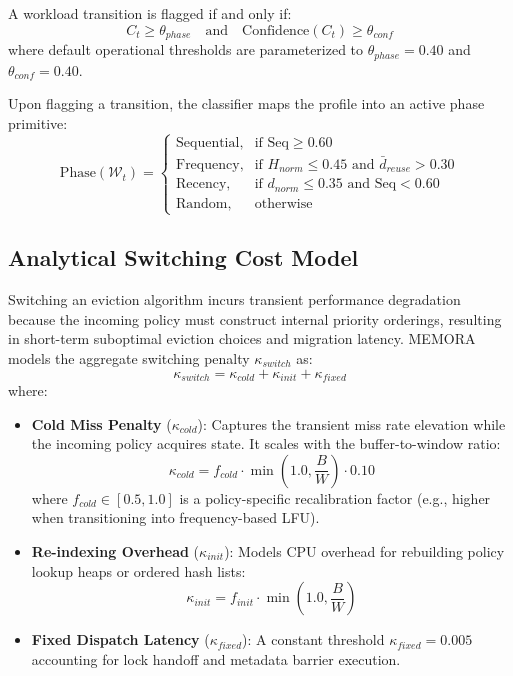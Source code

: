 \documentclass[conference]{IEEEtran}
\begin{document}
A workload transition is flagged if and only if:
\begin{equation}
C_t \ge \theta_{phase} \quad \text{and} \quad \text{Confidence}(C_t) \ge \theta_{conf}
\end{equation}
where default operational thresholds are parameterized to $\theta_{phase} = 0.40$ and $\theta_{conf} = 0.40$.

Upon flagging a transition, the classifier maps the profile into an active phase primitive:
\begin{equation}
\text{Phase}(\mathcal{W}_t) = \begin{cases}
\text{Sequential}, & \text{if } \text{Seq} \ge 0.60 \\
\text{Frequency}, & \text{if } H_{norm} \le 0.45 \text{ and } \bar{d}_{reuse} > 0.30 \\
\text{Recency}, & \text{if } d_{norm} \le 0.35 \text{ and } \text{Seq} < 0.60 \\
\text{Random}, & \text{otherwise}
\end{cases}
\end{equation}

\subsection{Analytical Switching Cost Model}
Switching an eviction algorithm incurs transient performance degradation because the incoming policy must construct internal priority orderings, resulting in short-term suboptimal eviction choices and migration latency. MEMORA models the aggregate switching penalty $\kappa_{switch}$ as:
\begin{equation}
\kappa_{switch} = \kappa_{cold} + \kappa_{init} + \kappa_{fixed}
\end{equation}
where:
\begin{itemize}
    \item \textbf{Cold Miss Penalty} ($\kappa_{cold}$): Captures the transient miss rate elevation while the incoming policy acquires state. It scales with the buffer-to-window ratio:
    \begin{equation}
    \kappa_{cold} = f_{cold} \cdot \min\left(1.0, \frac{B}{W}\right) \cdot 0.10
    \end{equation}
    where $f_{cold} \in [0.5, 1.0]$ is a policy-specific recalibration factor (e.g., higher when transitioning into frequency-based LFU).
    \item \textbf{Re-indexing Overhead} ($\kappa_{init}$): Models CPU overhead for rebuilding policy lookup heaps or ordered hash lists:
    \begin{equation}
    \kappa_{init} = f_{init} \cdot \min\left(1.0, \frac{B}{W}\right)
    \end{equation}
    \item \textbf{Fixed Dispatch Latency} ($\kappa_{fixed}$): A constant threshold $\kappa_{fixed} = 0.005$ accounting for lock handoff and metadata barrier execution.
\end{itemize}
\end{document}
